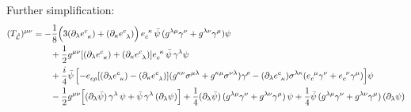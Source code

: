\documentclass[a4paper]{amsart}
\begin{document}
Further simplification:
\begin{align*}
(T_{\mathring{\mathcal{L}}})^{\mu \nu} 
&= 
- \frac{1}{8}
\Bigl(  
3 (\partial_\lambda 
\tensor{e}{^c_\kappa}) 
+
(\partial_\kappa \tensor{e}{^c_\lambda})  
\Bigr) 
\,
\tensor{e}{_c^\kappa} 
\, 
\bar{\psi} \, 
( g^{\lambda\mu}\gamma^\nu 
+ g^{\lambda\nu}\gamma^\mu )
\psi
\nonumber \\ %
&\qquad 
+
\frac{1}{2} 
g^{\mu\nu} 
[ 
(\partial_\lambda \tensor{e}{^c_\kappa})
+
(\partial_\kappa \tensor{e}{^c_\lambda}) 
]  
\tensor{e}{_c^\kappa} 
\, 
\bar{\psi} 
\, 
\gamma^\lambda  
\psi
\nonumber \\ %
&\qquad 
+ 
\frac{i}{4} 
\bar{\psi} \,
\Bigl[  
-
\tensor{e}{_c_\rho}
[
(\partial_\lambda \tensor{e}{^c_\kappa})
-  
(\partial_\kappa \tensor{e}{^c_\lambda})
]
(  
g^{\kappa \nu}
\sigma^{\mu\lambda}
+ 
g^{\kappa \mu}
\sigma^{\nu\lambda}
) 
\gamma^\rho  
- 
(\partial_\lambda\tensor{e}{^c_\kappa})
\sigma^{\lambda\kappa}
(
\tensor{e}{_c^\mu}
\gamma^\nu
+
\tensor{e}{_c^\nu}
\gamma^\mu
)
\Bigr]
\psi
\nonumber \\ 
&\qquad 
- \frac{1}{2}  g^{\mu\nu}
\Bigl[ 
(\partial_\lambda\bar{\psi}) 
\, \gamma^\lambda \, \psi 
+ \bar{\psi} \,\gamma^\lambda 
\, (\partial_\lambda \psi)
\Bigr]
+
\frac{1}{4}  
(\partial_\lambda\bar{\psi}) \,
( g^{\lambda\mu}\gamma^\nu 
+ g^{\lambda\nu}\gamma^\mu )
\, 
\psi 
+
\frac{1}{4} \bar{\psi} \,
( g^{\lambda\mu}\gamma^\nu 
+ g^{\lambda\nu}\gamma^\mu )
\, 
(\partial_\lambda \psi)
\end{align*}
\end{document}
